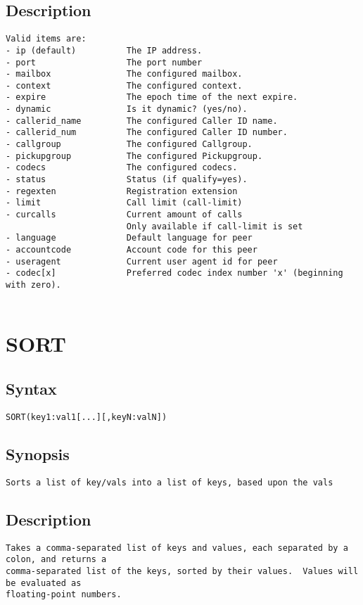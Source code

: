 \subsection{Description}
\begin{verbatim}
Valid items are:
- ip (default)          The IP address.
- port                  The port number
- mailbox               The configured mailbox.
- context               The configured context.
- expire                The epoch time of the next expire.
- dynamic               Is it dynamic? (yes/no).
- callerid_name         The configured Caller ID name.
- callerid_num          The configured Caller ID number.
- callgroup             The configured Callgroup.
- pickupgroup           The configured Pickupgroup.
- codecs                The configured codecs.
- status                Status (if qualify=yes).
- regexten              Registration extension
- limit                 Call limit (call-limit)
- curcalls              Current amount of calls 
                        Only available if call-limit is set
- language              Default language for peer
- accountcode           Account code for this peer
- useragent             Current user agent id for peer
- codec[x]              Preferred codec index number 'x' (beginning with zero).


\end{verbatim}


\section{SORT}
\subsection{Syntax}
\begin{verbatim}
SORT(key1:val1[...][,keyN:valN])
\end{verbatim}
\subsection{Synopsis}
\begin{verbatim}
Sorts a list of key/vals into a list of keys, based upon the vals
\end{verbatim}
\subsection{Description}
\begin{verbatim}
Takes a comma-separated list of keys and values, each separated by a colon, and returns a
comma-separated list of the keys, sorted by their values.  Values will be evaluated as
floating-point numbers.

\end{verbatim}


